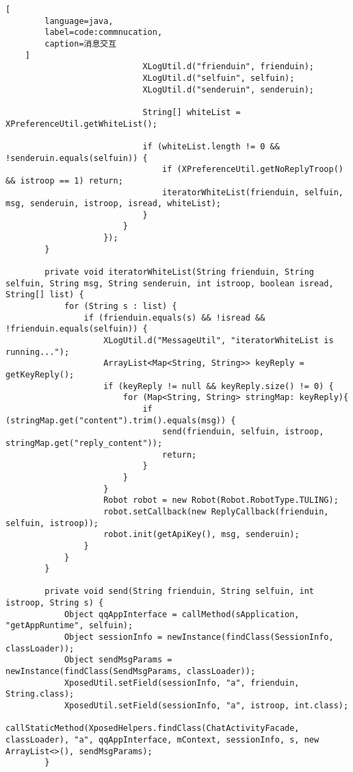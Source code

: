 \begin{appendices}
\begin{lstlisting}[
        language=java,
        label=code:commnucation,
        caption=消息交互
    ]
                            XLogUtil.d("frienduin", frienduin);
                            XLogUtil.d("selfuin", selfuin);
                            XLogUtil.d("senderuin", senderuin);
    
                            String[] whiteList = XPreferenceUtil.getWhiteList();
    
                            if (whiteList.length != 0 && !senderuin.equals(selfuin)) {
                                if (XPreferenceUtil.getNoReplyTroop() && istroop == 1) return;
                                iteratorWhiteList(frienduin, selfuin, msg, senderuin, istroop, isread, whiteList);
                            }
                        }
                    });
        }
    
        private void iteratorWhiteList(String frienduin, String selfuin, String msg, String senderuin, int istroop, boolean isread, String[] list) {
            for (String s : list) {
                if (frienduin.equals(s) && !isread && !frienduin.equals(selfuin)) {
                    XLogUtil.d("MessageUtil", "iteratorWhiteList is running...");
                    ArrayList<Map<String, String>> keyReply = getKeyReply();
                    if (keyReply != null && keyReply.size() != 0) {
                        for (Map<String, String> stringMap: keyReply){
                            if (stringMap.get("content").trim().equals(msg)) {
                                send(frienduin, selfuin, istroop, stringMap.get("reply_content"));
                                return;
                            }
                        }
                    }
                    Robot robot = new Robot(Robot.RobotType.TULING);
                    robot.setCallback(new ReplyCallback(frienduin, selfuin, istroop));
                    robot.init(getApiKey(), msg, senderuin);
                }
            }
        }
    
        private void send(String frienduin, String selfuin, int istroop, String s) {
            Object qqAppInterface = callMethod(sApplication, "getAppRuntime", selfuin);
            Object sessionInfo = newInstance(findClass(SessionInfo, classLoader));
            Object sendMsgParams = newInstance(findClass(SendMsgParams, classLoader));
            XposedUtil.setField(sessionInfo, "a", frienduin, String.class);
            XposedUtil.setField(sessionInfo, "a", istroop, int.class);
            callStaticMethod(XposedHelpers.findClass(ChatActivityFacade, classLoader), "a", qqAppInterface, mContext, sessionInfo, s, new ArrayList<>(), sendMsgParams);
        }
    

\end{lstlisting}
\end{appendices}
